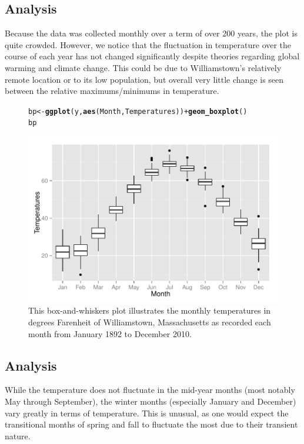 \documentclass{article}\usepackage{graphicx, color}
\makeatletter
\def\maxwidth{ %
  \ifdim\Gin@nat@width>\linewidth
    \linewidth
  \else
    \Gin@nat@width
  \fi
}
\newcommand{\hlfunctioncall}[1]{\textcolor[rgb]{0.501960784313725,0,0.329411764705882}{\textbf{#1}}}%
\newenvironment{kframe}{%
 \def\at@end@of@kframe{}%
 \ifinner\ifhmode%
  \def\at@end@of@kframe{\end{minipage}}%
  \begin{minipage}{\columnwidth}%
 \fi\fi%
 \def\FrameCommand##1{\hskip\@totalleftmargin \hskip-\fboxsep
 \colorbox{shadecolor}{##1}\hskip-\fboxsep
     \hskip-\linewidth \hskip-\@totalleftmargin \hskip\columnwidth}%
 \MakeFramed {\advance\hsize-\width
   \@totalleftmargin\z@ \linewidth\hsize
   \@setminipage}}%
 {\par\unskip\endMakeFramed%
 \at@end@of@kframe}
\newenvironment{knitrout}{}{} %
\makeatother
\begin{document}
\subsection{Analysis}
Because the data was collected monthly over a term of over 200 years, the plot is quite crowded. However, we notice
that the fluctuation in temperature over the course of each year has not changed significantly despite theories regarding
global warming and climate change. This could be due to Williamstown's relatively remote location or to its low population,
but overall very little change is seen between the relative maximums/minimums in temperature.

\begin{figure}
\begin{knitrout}
\color{fgcolor}\begin{kframe}
\begin{alltt}
bp <- \hlfunctioncall{ggplot}(y, \hlfunctioncall{aes}(Month, Temperatures)) + \hlfunctioncall{geom_boxplot}()
bp
\end{alltt}
\end{kframe}
\includegraphics[width=\maxwidth]{figure/graph1_5} 

\end{knitrout}


\caption{This box-and-whiskers plot illustrates the monthly temperatures in degrees Farenheit of Williamstown, Massachusetts as recorded each month from January 1892 to December 2010.}
\end{figure}

\subsection{Analysis}
While the temperature does not fluctuate in the mid-year months (most notably May through September), the winter months (especially January and December) vary greatly in terms of temperature. This is unusual, as one would expect the transitional months of spring and fall to fluctuate the most due to their transient nature.
\end{document}

